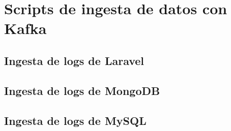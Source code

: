 \chapter{Scripts de ingesta de datos con Kafka}\label{anexo:kafka}
\section{Ingesta de logs de Laravel}



\newpage{}
\section{Ingesta de logs de MongoDB}



\newpage{}
\section{Ingesta de logs de MySQL}


